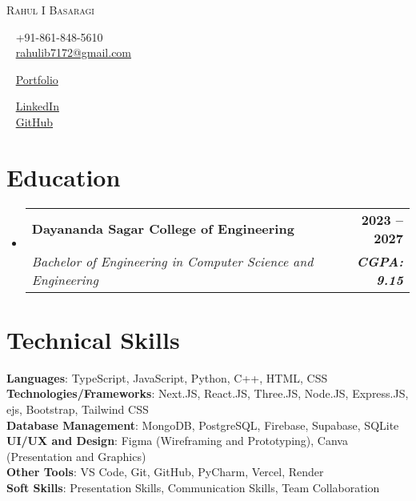 \documentclass[letterpaper,11pt]{article}
\makeatletter
\newcommand{\resumeSubheading}[4]{
  \vspace{-2pt}\item
    \begin{tabular*}{1.0\textwidth}[t]{l@{\extracolsep{\fill}}r}
      \textbf{#1} & \textbf{\small #2} \\
      \textit{\small#3} & \textit{\small #4} \\
    \end{tabular*}\vspace{-7pt}
}
\newcommand{\resumeSubHeadingListStart}{\begin{itemize}[leftmargin=0.0in, label={}]}
\newcommand{\resumeSubHeadingListEnd}{\end{itemize}}
\makeatother
\begin{document}
\begin{center}
  {\Huge \scshape Rahul I Basaragi} \\[4pt]
  \begin{minipage}[t]{0.3\textwidth}
    \raggedright
    \faPhone~ +91-861-848-5610 \\
    \faEnvelope~ \href{mailto:rahulib7172@gmail.com}{rahulib7172@gmail.com}
  \end{minipage}
  \begin{minipage}[t]{0.35\textwidth}
    \centering
    \faGlobe~ \href{https://rahulibasaragi.tech}{Portfolio} \\
  \end{minipage}
  \begin{minipage}[t]{0.3\textwidth}
    \raggedleft
    \faLinkedin~ \href{https://www.linkedin.com/in/rahul-i-basaragi-05886829b/}{LinkedIn} \\
    \faGithub~ \href{https://github.com/RahulIB5}{GitHub}
  \end{minipage}
\end{center}




\section{Education}
\resumeSubHeadingListStart
    \resumeSubheading
      {Dayananda Sagar College of Engineering} {2023 -- 2027}
      {Bachelor of Engineering in Computer Science and Engineering } {\textbf{CGPA: 9.15}}
\resumeSubHeadingListEnd


\section{Technical Skills}
 \begin{itemize}[leftmargin=0.15in, label={}]
    \small{\item{
     \textbf{Languages}{: TypeScript, JavaScript, Python, C++, HTML, CSS} \\
     \textbf{Technologies/Frameworks}{: Next.JS, React.JS, Three.JS, Node.JS, Express.JS,  ejs, Bootstrap, Tailwind CSS} \\
     \textbf{Database Management}{: MongoDB, PostgreSQL, Firebase, Supabase, SQLite} \\
     \textbf{UI/UX and Design}{: Figma (Wireframing and Prototyping), Canva (Presentation and Graphics)} \\
     \textbf{Other Tools}{: VS Code, Git, GitHub, PyCharm, Vercel, Render} \\
     \textbf{Soft Skills}{: Presentation Skills, Communication Skills, Team Collaboration} \\
    }}
 \end{itemize}
 \vspace{-16pt}
\end{document}
